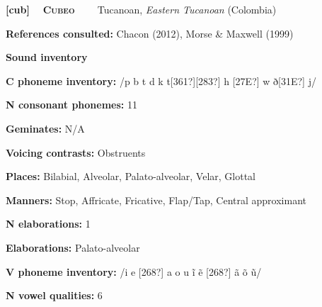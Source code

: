 \clearpage\begin{styleBody}
\textbf{[cub] }\ \ \textbf{\textsc{Cubeo}}\textbf{\ \ \ \ }Tucanoan, \textit{Eastern Tucanoan} (Colombia)
\end{styleBody}

\begin{styleBody}
\textbf{References consulted: }Chacon (2012), Morse \& Maxwell (1999)
\end{styleBody}

\begin{styleBody}
\textbf{Sound inventory}
\end{styleBody}

\begin{styleBody}
\textbf{C phoneme inventory:} /p b t d k t[361?][283?] h [27E?] w ð[31E?] j/
\end{styleBody}

\begin{styleBody}
\textbf{N consonant phonemes:} 11
\end{styleBody}

\begin{styleBody}
\textbf{Geminates:} N/A
\end{styleBody}

\begin{styleBody}
\textbf{Voicing contrasts:} Obstruents
\end{styleBody}

\begin{styleBody}
\textbf{Places:} Bilabial, Alveolar, Palato-alveolar, Velar, Glottal
\end{styleBody}

\begin{styleBody}
\textbf{Manners:} Stop, Affricate, Fricative, Flap/Tap, Central approximant
\end{styleBody}

\begin{styleBody}
\textbf{N elaborations:} 1
\end{styleBody}

\begin{styleBody}
\textbf{Elaborations:} Palato-alveolar
\end{styleBody}

\begin{styleBody}
\textbf{V phoneme inventory:} /i e [268?] a o u \~{i} \~{e} [268?] \~{a} \~{o} \~{u}/
\end{styleBody}

\begin{styleBody}
\textbf{N vowel qualities:} 6
\end{styleBody}

